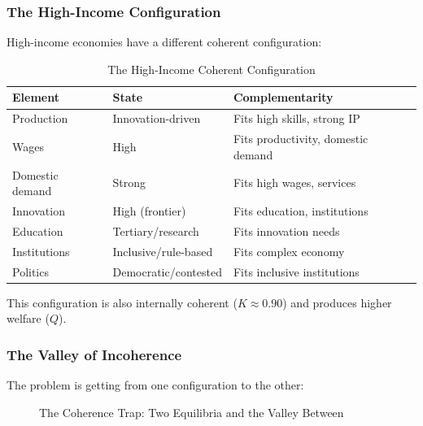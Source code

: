 \subsubsection{The High-Income Configuration}

High-income economies have a different coherent configuration:

\begin{table}[htbp]
\centering
\caption{The High-Income Coherent Configuration}
\label{tab:hi-config}
\begin{tabular}{@{}lll@{}}
\toprule
\textbf{Element} & \textbf{State} & \textbf{Complementarity} \\
\midrule
Production & Innovation-driven & Fits high skills, strong IP \\
Wages & High & Fits productivity, domestic demand \\
Domestic demand & Strong & Fits high wages, services \\
Innovation & High (frontier) & Fits education, institutions \\
Education & Tertiary/research & Fits innovation needs \\
Institutions & Inclusive/rule-based & Fits complex economy \\
Politics & Democratic/contested & Fits inclusive institutions \\
\bottomrule
\end{tabular}
\end{table}

This configuration is also internally coherent ($K \approx 0.90$) and produces 
higher welfare ($Q$).

\subsubsection{The Valley of Incoherence}

The problem is getting from one configuration to the other:

\begin{figure}[htbp]
\centering
\caption{The Coherence Trap: Two Equilibria and the Valley Between}
\label{fig:coherence-trap}
\begin{center}
\end{center}
\end{figure}

